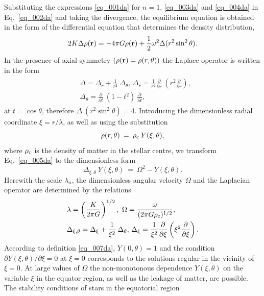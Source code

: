 \documentclass{caosp308}
\begin{document}
Substituting the expressions \eqref{eq_001da} for $n=1$, \eqref{eq_003da} and \eqref{eq_004da} in Eq.~\eqref{eq_002da} and taking the divergence, the equilibrium equation is obtained in the form of the differential equation that determines the density distribution,
\begin{equation}
\label{eq_005da}
2K\Delta\rho({\bf r})=-4\pi G\rho({\bf r})+\frac{1}{2}\omega^2\Delta(r^2\sin^2\theta).
\end{equation}
In the presence of axial symmetry  $(\rho({\bf r})=\rho(r,\theta))$ the Laplace operator is written in the form
\begin{eqnarray}
\label{eq_006da}
\begin{split}
&\Delta=\Delta_r +\frac{1}{r^2}\:\Delta_{\theta},\,
\Delta_r=\frac{1}{r^2}\frac{\partial}{\partial r}\:\left(r^2 \frac{\partial}{\partial r}\right),\\
&\Delta_{\theta}=\frac{\partial}{\partial t}\:(1-t^2)\:\frac{\partial}{\partial t},
\end{split}
\end{eqnarray}
at $t=\cos \theta$, therefore $\Delta\:(r^2 \sin^2 \theta)=4$. Introducing the dimensionless radial coordinate $\xi = r/\lambda$, as well as using the substitution
\begin{equation}
\label{eq_007da}
\rho(r,\theta)\:=\:\rho_{\rm c} \:Y(\xi,\theta),
\end{equation}
where $\rho_{\rm c}$ is the density of matter in the stellar centre, we transform Eq.~\eqref{eq_005da} to the dimensionless form
\begin{equation}
\label{eq_008da}
\Delta_{\xi,\theta}\:Y(\xi,\theta)\:=\:\Omega^2-Y(\xi,\theta).
\end{equation}
Herewith the scale  $\lambda_n$, the dimensionless angular velocity $\Omega$ and the Laplacian operator are determined by the relations
\begin{eqnarray}
\label{eq_009da}
\begin{split}
&\lambda=\left(\frac{K}{2\pi G}\right)^{1/2},\,\,\Omega=\frac{\omega}{(2\pi G\rho_{\rm c})^{1/2}},\\
&\Delta_{\xi,\theta} = \Delta_{\xi} +\frac{1}{\xi^2}\:\Delta_{\theta}, \, \Delta_{\xi} =\frac{1}{\xi^2}\frac{\partial}{\partial\xi} \left(\xi^2 \frac{\partial}{\partial\xi}\right).
\end{split}
\end{eqnarray}
According to definition \eqref{eq_007da}, $Y(0,\theta)=1$ and the condition $\partial Y(\xi,\theta)/\partial\xi=0$ at $\xi=0$ corresponds to the solutions regular in the vicinity of $\xi=0$. At large values of $\Omega$  the non-monotonous dependence  $Y (\xi,\theta)$  on the variable $\xi$ in the equator region, as well as the leakage of matter, are possible. The stability conditions of stars in the equatorial region
\end{document}
